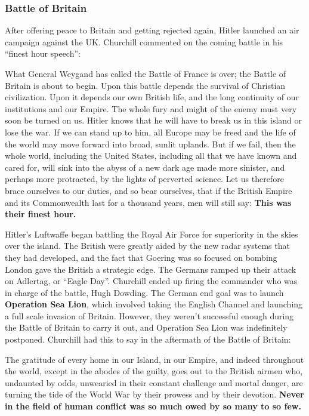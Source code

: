 \subsubsection*{Battle of Britain}

After offering peace to Britain and getting rejected again,
Hitler launched an air campaign against the UK\@.
Churchill commented on the coming battle in his ``finest hour speech'':
\begin{quoting}
  What General Weygand has called the Battle of France is over;
  the Battle of Britain is about to begin.
  Upon this battle depends the survival of Christian civilization.
  Upon it depends our own British life, and the long continuity of our institutions and our Empire.
  The whole fury and might of the enemy must very soon be turned on us.
  Hitler knows that he will have to break us in this island or lose the war.
  If we can stand up to him,
  all Europe may be freed and the life of the world may move forward into broad, sunlit uplands.
  But if we fail, then the whole world, including the United States,
  including all that we have known and cared for,
  will sink into the abyss of a new dark age made more sinister,
  and perhaps more protracted, by the lights of perverted science.
  Let us therefore brace ourselves to our duties, and so bear ourselves,
  that if the British Empire and its Commonwealth last for a thousand years, men will still say:
  \textbf{This was their finest hour.}
\end{quoting}

Hitler's Luftwaffe began battling the Royal Air Force for superiority in the skies over the island.
The British were greatly aided by the new radar systems that they had developed,
and the fact that Goering was so focused on bombing London gave the British a strategic edge.
The Germans ramped up their attack on Adlertag, or ``Eagle Day''.
Churchill ended up firing the commander who was in charge of the battle, Hugh Dowding.
The German end goal was to launch \textbf{Operation Sea Lion},
which involved taking the English Channel and launching a full scale invasion of Britain.
However, they weren't successful enough during the Battle of Britain to carry it out,
and Operation Sea Lion was indefinitely postponed.
Churchill had this to say in the aftermath of the Battle of Britain:
\begin{quoting}
  The gratitude of every home in our Island, in our Empire, and indeed throughout the world,
  except in the abodes of the guilty, goes out to the British airmen who,
  undaunted by odds, unwearied in their constant challenge and mortal danger,
  are turning the tide of the World War by their prowess and by their devotion.
  \textbf{Never in the field of human conflict was so much owed by so many to so few.}
\end{quoting}

